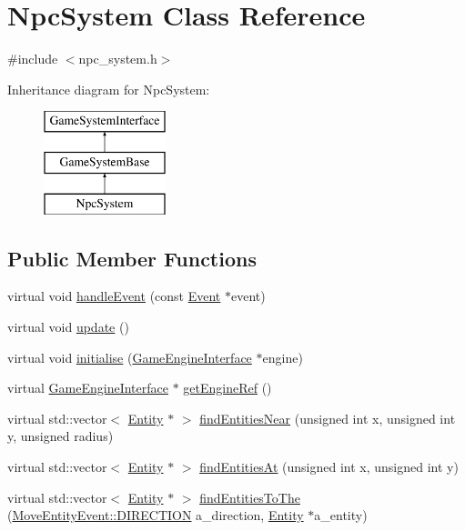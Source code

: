 \hypertarget{classNpcSystem}{\section{Npc\-System Class Reference}
\label{classNpcSystem}
}


{\ttfamily \#include $<$npc\-\_\-system.\-h$>$}

Inheritance diagram for Npc\-System\-:\begin{figure}[H]
\begin{center}
\leavevmode
\includegraphics[height=3.000000cm]{classNpcSystem}
\end{center}
\end{figure}
\subsection*{Public Member Functions}
\begin{DoxyCompactItemize}
\item 
virtual void \hyperlink{classNpcSystem_ad4c89f0e50944fc2f9dd7206411ced53}{handle\-Event} (const \hyperlink{classEvent}{Event} $\ast$event)
\item 
virtual void \hyperlink{classNpcSystem_a88d87a8ec981e5cf1f4ed4340123a9d8}{update} ()
\item 
virtual void \hyperlink{classGameSystemBase_a55b4fc27cbfccd3c724c2e5984d78625}{initialise} (\hyperlink{classGameEngineInterface}{Game\-Engine\-Interface} $\ast$engine)
\item 
virtual \hyperlink{classGameEngineInterface}{Game\-Engine\-Interface} $\ast$ \hyperlink{classGameSystemBase_a1954c5a1c79963554805bc25b2cd6072}{get\-Engine\-Ref} ()
\item 
virtual std\-::vector$<$ \hyperlink{classEntity}{Entity} $\ast$ $>$ \hyperlink{classGameSystemBase_aae270a88f1077a091e6033514b889abd}{find\-Entities\-Near} (unsigned int x, unsigned int y, unsigned radius)
\item 
virtual std\-::vector$<$ \hyperlink{classEntity}{Entity} $\ast$ $>$ \hyperlink{classGameSystemBase_a7aa9912fc078d990dbfb480e411bd3bc}{find\-Entities\-At} (unsigned int x, unsigned int y)
\item 
virtual std\-::vector$<$ \hyperlink{classEntity}{Entity} $\ast$ $>$ \hyperlink{classGameSystemBase_a44456ef40ac565b9d6b65f3b1531a4ef}{find\-Entities\-To\-The} (\hyperlink{classMoveEntityEvent_a7058a943643bee9164a21e62e3392807}{Move\-Entity\-Event\-::\-D\-I\-R\-E\-C\-T\-I\-O\-N} a\-\_\-direction, \hyperlink{classEntity}{Entity} $\ast$a\-\_\-entity)
\end{DoxyCompactItemize}
